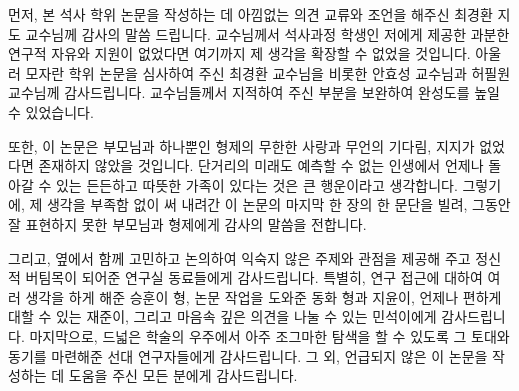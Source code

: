 
먼저, 본 석사 학위 논문을 작성하는 데 아낌없는 의견 교류와 조언을 해주신 최경환 지도 교수님께 감사의 말씀 드립니다.
교수님께서 석사과정 학생인 저에게 제공한 과분한 연구적 자유와 지원이 없었다면 여기까지 제 생각을 확장할 수 없었을 것입니다.
아울러 모자란 학위 논문을 심사하여 주신 최경환 교수님을 비롯한 안효성 교수님과 허필원 교수님께 감사드립니다.
교수님들께서 지적하여 주신 부분을 보완하여 완성도를 높일 수 있었습니다.

또한, 이 논문은 부모님과 하나뿐인 형제의 무한한 사랑과 무언의 기다림, 지지가 없었다면 존재하지 않았을 것입니다.
단거리의 미래도 예측할 수 없는 인생에서 언제나 돌아갈 수 있는 든든하고 따뜻한 가족이 있다는 것은 큰 행운이라고 생각합니다.
그렇기에, 제 생각을 부족함 없이 써 내려간 이 논문의 마지막 한 장의 한 문단을 빌려, 그동안 잘 표현하지 못한 부모님과 형제에게 감사의 말씀을 전합니다.

그리고, 옆에서 함께 고민하고 논의하여 익숙지 않은 주제와 관점을 제공해 주고 정신적 버팀목이 되어준 연구실 동료들에게 감사드립니다.
특별히, 연구 접근에 대하여 여러 생각을 하게 해준 승훈이 형, 논문 작업을 도와준 동화 형과 지윤이, 언제나 편하게 대할 수 있는 재준이, 그리고 마음속 깊은 의견을 나눌 수 있는 민석이에게 감사드립니다.
마지막으로, 드넓은 학술의 우주에서 아주 조그마한 탐색을 할 수 있도록 그 토대와 동기를 마련해준 선대 연구자들에게 감사드립니다.
그 외, 언급되지 않은 이 논문을 작성하는 데 도움을 주신 모든 분에게 감사드립니다.